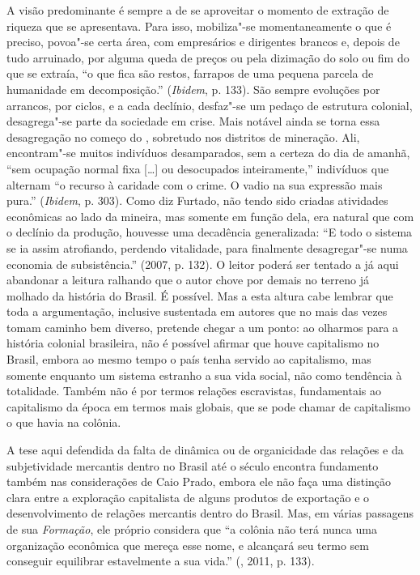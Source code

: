{A visão predominante é sempre a de se aproveitar o momento de extração
de riqueza que se apresentava. Para isso, mobiliza"-se momentaneamente
o que é preciso, povoa"-se certa área, com empresários e dirigentes
brancos e, depois de tudo arruinado, por alguma queda de preços ou pela
dizimação do solo ou fim do que se extraía, ``o que fica são restos,
farrapos de uma pequena parcela de humanidade em decomposição.''
(\emph{Ibidem}, p. 133). São sempre evoluções por arrancos, por ciclos,
e a cada declínio, desfaz"-se um pedaço de estrutura colonial,
desagrega"-se parte da sociedade em crise. Mais notável ainda se torna
essa desagregação no começo do , sobretudo nos distritos de
mineração. Ali, encontram"-se muitos indivíduos desamparados, sem a
certeza do dia de amanhã, ``sem ocupação normal fixa [\ldots{}] ou
desocupados inteiramente,'' indivíduos que alternam ``o recurso à
caridade com o crime. O vadio na sua expressão mais pura.''
(\emph{Ibidem}, p. 303). Como diz Furtado, não tendo sido criadas
atividades econômicas ao lado da mineira, mas somente em função dela,
era natural que com o declínio da produção, houvesse uma decadência
generalizada: ``E todo o sistema se ia assim atrofiando, perdendo
vitalidade, para finalmente desagregar"-se numa economia de
subsistência.'' (2007, p. 132). O leitor poderá ser tentado a já
aqui abandonar a leitura ralhando que o autor chove por demais no
terreno já molhado da história do Brasil. É possível. Mas a esta
altura cabe lembrar que toda a argumentação, inclusive sustentada
em autores que no mais das vezes tomam caminho bem diverso, pretende
chegar a um ponto: ao olharmos para a história colonial brasileira,
não é possível afirmar que houve capitalismo no Brasil, embora ao
mesmo tempo o país tenha servido ao capitalismo, mas somente enquanto
um sistema estranho a sua vida social, não como tendência à totalidade.
Também não é por termos relações escravistas, fundamentais ao
capitalismo da época em termos mais globais, que se pode chamar de
capitalismo o que havia na colônia.

A tese aqui defendida da falta de dinâmica ou de organicidade das
relações e da subjetividade mercantis dentro no Brasil até o século 
encontra fundamento também nas considerações de Caio Prado, embora ele
não faça uma distinção clara entre a exploração capitalista de alguns
produtos de exportação e o desenvolvimento de relações mercantis dentro
do Brasil. Mas, em várias passagens de sua \emph{Formação}, ele próprio
considera que ``a colônia não terá nunca uma organização econômica que
mereça esse nome, e alcançará seu termo sem conseguir equilibrar
estavelmente a sua vida.'' (, 2011, p. 133).

}
